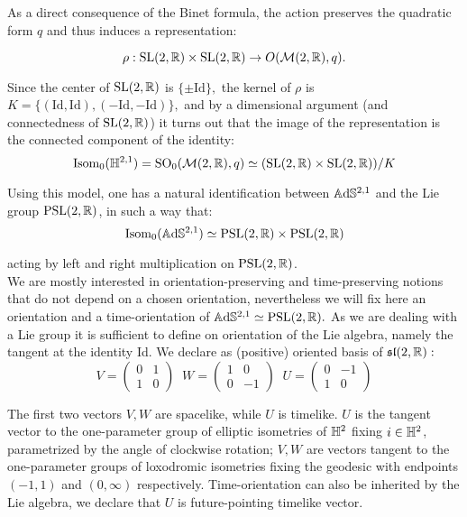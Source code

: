 As a direct consequence of the Binet formula, the action preserves the quadratic form $q$    and thus induces a representation: 

\[ \rho:\text{SL}(2,\mathbb{R})\times \text{SL}(2,\mathbb{R})\to O(\mathcal{M}(2,\mathbb{R}),q). \]

Since the center of $\text{SL}(2,\mathbb{R})$ is $\{\pm \text{Id}\},$ the kernel of $\rho$ is $K=\{(\text{Id},\text{Id}),(-\text{Id},-\text{Id})\},$ and by a dimensional argument (and connectedness of $\text{SL}(2,\mathbb{R})$) it turns out that the image of the representation is the connected component of the identity: 
\[
    \text{Isom}_0(\mathbb{H}^{2,1})=\text{SO}_0(\mathcal{M}(2,\mathbb{R}),q)\simeq (\text{SL}(2,\mathbb{R})\times \text{SL}(2,\mathbb{R}))/K
\]
    
Using this model, one has a natural identification between $\mathbb{A}\mathrm{d}\mathbb{S}^{2,1}$ and the Lie group $\text{PSL}(2,\mathbb{R})$, in such a way that: 
\begin{equation}\label{isomiso}
    \text{Isom}_0(\mathbb{A}\mathrm{d}\mathbb{S}^{2,1})\simeq \text{PSL}(2,\mathbb{R})\times\text{PSL}(2,\mathbb{R})
\end{equation}
    
acting by left and right multiplication on $\text{PSL}(2,\mathbb{R})$.\\ We are mostly interested in orientation-preserving and time-preserving notions that do not depend on a chosen orientation, nevertheless we will fix here an orientation and a time-orientation of $\mathbb{A}\mathrm{d}\mathbb{S}^{2,1}\simeq\text{PSL}(2,\mathbb{R}).$ As we are dealing with a Lie group it is sufficient to define on orientation of the Lie algebra, namely the tangent at the identity Id. We declare as (positive) oriented basis of $\mathfrak{sl}(2,\mathbb{R}):$ 
\begin{equation}\label{tangent}
V=\begin{pmatrix}
  0 & 1 \\ 1 & 0
\end{pmatrix}\;\;
W=\begin{pmatrix}
  1 & 0 \\ 0 & -1
\end{pmatrix}
\;\;
U=\begin{pmatrix}
  0 & -1 \\ 1 & 0
\end{pmatrix}
\end{equation}

The first two vectors $V,W$ are spacelike, while $U$ is timelike. $U$ is the tangent vector to the one-parameter group of elliptic isometries of $\mathbb{H}^2$ fixing $i\in\mathbb{H}^2$, parametrized by the angle of clockwise rotation; $V,W$ are vectors tangent to the one-parameter groups of loxodromic isometries fixing the geodesic with endpoints $(-1,1)$ and $(0,\infty)$ respectively. Time-orientation can also be inherited by the Lie algebra, we declare that $U$ is future-pointing timelike vector. \\

